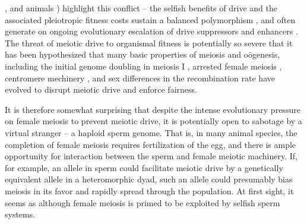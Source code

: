\documentclass[12pt,letterpaper]{article}
\begin{document}
\citep{Buckler1999,Fishman2005,Fishman2008}, and animals
\citep{Agulnik1990,Wu2005,Pardo-ManuelDeVillena2001c}) highlight this
conflict -- the selfish benefits of drive and the associated
pleiotropic fitness costs sustain a balanced polymorphism
\citep{Prout1973}, 
and often generate on ongoing evolutionary escalation of drive suppressors and enhancers \citep{Dawe1996,Fishman2008}. 
The threat of meiotic drive to organismal fitness is potentially so
severe that it has been hypothesized that many basic properties of
meiosis and o\"{o}genesis, including the initial genome doubling in
meiosis I \citep{Haig1991}, arrested female meiosis
\citep{Mira1998}, centromere mechinery \citep{MalikHenikoff}, and sex differences in the recombination rate \citep{Haig2010,Brandvain2012} have evolved to disrupt meiotic drive and enforce fairness.

It is therefore somewhat surprising that despite the intense evolutionary pressure on female meiosis to prevent meiotic drive, 
it is potentially open to sabotage by a virtual stranger -- a haploid sperm genome.
That is, in many animal species, the completion of female meiosis requires fertilization of the egg, 
and there is ample opportunity for interaction between the sperm and female meiotic machinery.
If, for example, an allele in sperm could facilitate meiotic drive by a genetically equivalent allele in a 
heteromorphic dyad, such an allele could presumably bias meiosis in its favor and rapidly spread through the population.
At first sight, it seems as although female meiosis is primed to be exploited by selfish sperm systems.  

\end{document}
